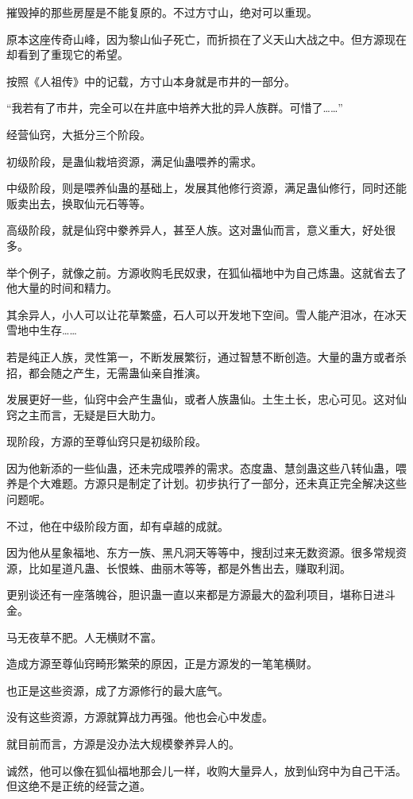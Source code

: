 \begin{this_body}
摧毁掉的那些房屋是不能复原的。不过方寸山，绝对可以重现。

原本这座传奇山峰，因为黎山仙子死亡，而折损在了义天山大战之中。但方源现在却看到了重现它的希望。

按照《人祖传》中的记载，方寸山本身就是市井的一部分。

“我若有了市井，完全可以在井底中培养大批的异人族群。可惜了……”

经营仙窍，大抵分三个阶段。

初级阶段，是蛊仙栽培资源，满足仙蛊喂养的需求。

中级阶段，则是喂养仙蛊的基础上，发展其他修行资源，满足蛊仙修行，同时还能贩卖出去，换取仙元石等等。

高级阶段，就是仙窍中豢养异人，甚至人族。这对蛊仙而言，意义重大，好处很多。

举个例子，就像之前。方源收购毛民奴隶，在狐仙福地中为自己炼蛊。这就省去了他大量的时间和精力。

其余异人，小人可以让花草繁盛，石人可以开发地下空间。雪人能产泪冰，在冰天雪地中生存……

若是纯正人族，灵性第一，不断发展繁衍，通过智慧不断创造。大量的蛊方或者杀招，都会随之产生，无需蛊仙亲自推演。

发展更好一些，仙窍中会产生蛊仙，或者人族蛊仙。土生土长，忠心可见。这对仙窍之主而言，无疑是巨大助力。

现阶段，方源的至尊仙窍只是初级阶段。

因为他新添的一些仙蛊，还未完成喂养的需求。态度蛊、慧剑蛊这些八转仙蛊，喂养是个大难题。方源只是制定了计划。初步执行了一部分，还未真正完全解决这些问题呢。

不过，他在中级阶段方面，却有卓越的成就。

因为他从星象福地、东方一族、黑凡洞天等等中，搜刮过来无数资源。很多常规资源，比如星道凡蛊、长恨蛛、曲丽木等等，都是外售出去，赚取利润。

更别谈还有一座落魄谷，胆识蛊一直以来都是方源最大的盈利项目，堪称日进斗金。

马无夜草不肥。人无横财不富。

造成方源至尊仙窍畸形繁荣的原因，正是方源发的一笔笔横财。

也正是这些资源，成了方源修行的最大底气。

没有这些资源，方源就算战力再强。他也会心中发虚。

就目前而言，方源是没办法大规模豢养异人的。

诚然，他可以像在狐仙福地那会儿一样，收购大量异人，放到仙窍中为自己干活。但这绝不是正统的经营之道。


\end{this_body}
